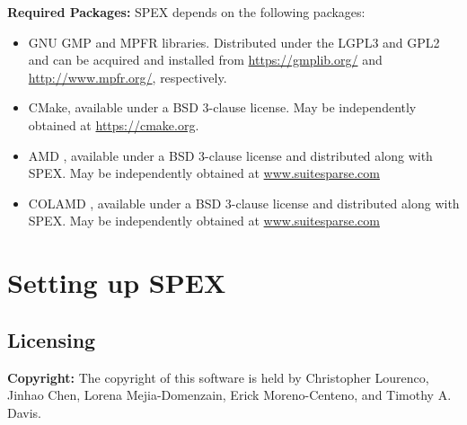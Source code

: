 \documentclass[12pt,oneside]{book}
\theoremstyle{definition}
\begin{document}
\noindent \textbf{Required Packages:} SPEX depends on the following packages:
\begin{itemize} 
    \item GNU GMP \cite{granlund2015gnu} and MPFR \cite{fousse2007mpfr} libraries. Distributed under the LGPL3 and GPL2 and can be acquired and installed from \url{https://gmplib.org/} and \url{http://www.mpfr.org/}, respectively.

    \item CMake, available under a BSD 3-clause license. May be independently obtained at \url{https://cmake.org}.
    
    \item AMD \cite{amestoy1996approximate,amestoy2004algorithmamd}, available under a BSD 3-clause license and distributed along with SPEX. May be independently obtained at \url{www.suitesparse.com}
    
    \item COLAMD \cite{davis2004column,davis2004algorithmcolamd}, available under a BSD 3-clause license and distributed along with SPEX. May be independently obtained at \url{www.suitesparse.com}

\end{itemize}



\chapter{Setting up SPEX}\vspace{-0.75in}

\section{Licensing} \label{s:util:licensing}
\textbf{Copyright:} The copyright of this software is held by Christopher Lourenco, Jinhao Chen, Lorena Mejia-Domenzain, Erick Moreno-Centeno, and Timothy A. Davis.\\
\end{document}

